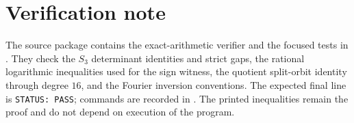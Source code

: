 \section{Verification note}\label{sec:exactness}

The source package contains the exact-arithmetic verifier
 and the focused tests in
.  They check the \(S_3\) determinant
identities and strict gaps, the rational logarithmic inequalities used for the
sign witness, the quotient split-orbit identity through degree \(16\), and the
Fourier inversion conventions.  The expected final line is
\texttt{STATUS: PASS}; commands are recorded in .  The
printed inequalities remain the proof and do not depend on execution of the
program.
